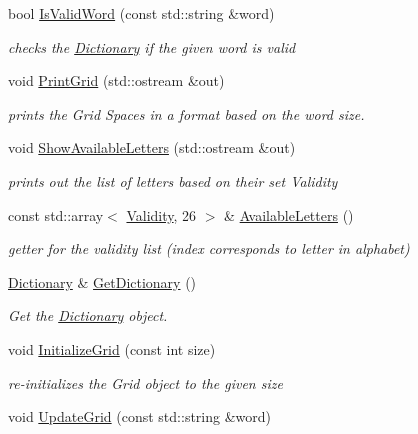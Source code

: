 \begin{DoxyCompactItemize}
bool \hyperlink{classgame_1_1Game_a729991a58de1542bdda32a0cc2778899}{Is\+Valid\+Word} (const std\+::string \&word)
\begin{DoxyCompactList}\small\item\em checks the \hyperlink{classgame_1_1Dictionary}{Dictionary} if the given word is valid \end{DoxyCompactList}\item 
void \hyperlink{classgame_1_1Game_aa86e27688c8e1d513c47afc53467dbea}{Print\+Grid} (std\+::ostream \&out)
\begin{DoxyCompactList}\small\item\em prints the Grid Spaces in a format based on the word size. \end{DoxyCompactList}\item 
void \hyperlink{classgame_1_1Game_a156ae4dc99b8adb87a83d2c72ab24285}{Show\+Available\+Letters} (std\+::ostream \&out)
\begin{DoxyCompactList}\small\item\em prints out the list of letters based on their set Validity \end{DoxyCompactList}\item 
const std\+::array$<$ \hyperlink{Validity_8h_acb8ce664e8a953fe8c27d7f0b37cbca4}{Validity}, 26 $>$ \& \hyperlink{classgame_1_1Game_aa2b90ae6940730e872300d2727a86f24}{Available\+Letters} ()
\begin{DoxyCompactList}\small\item\em getter for the validity list (index corresponds to letter in alphabet) \end{DoxyCompactList}\item 
\hyperlink{classgame_1_1Dictionary}{Dictionary} \& \hyperlink{classgame_1_1Game_a59a7ae6a629f360d6aa7c9b74a33125b}{Get\+Dictionary} ()
\begin{DoxyCompactList}\small\item\em Get the \hyperlink{classgame_1_1Dictionary}{Dictionary} object. \end{DoxyCompactList}\item 
void \hyperlink{classgame_1_1Game_a92368c63688b94a1b67f7fefb3449e9e}{Initialize\+Grid} (const int size)
\begin{DoxyCompactList}\small\item\em re-\/initializes the Grid object to the given size \end{DoxyCompactList}\item 
void \hyperlink{classgame_1_1Game_a7785bad3273c5c3be55ad44fbe78b117}{Update\+Grid} (const std\+::string \&word)

\end{DoxyCompactItemize}
